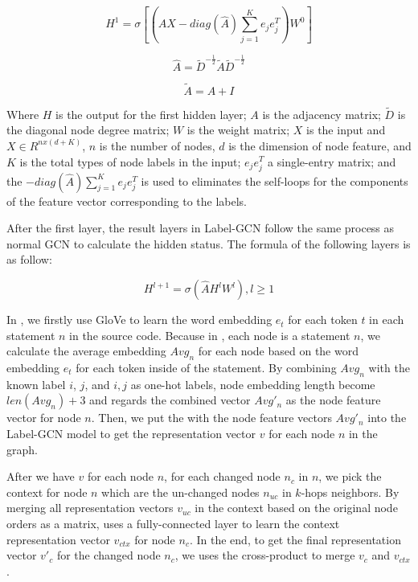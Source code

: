 \begin{equation}\label{eq1}
	H^1 = \sigma [(\hat{A}X-diag(\hat{A})\sum_{j=1}^{K}e_je^T_j)W^0]
\end{equation}

\begin{equation}\label{eq2}
	\hat{A} = \tilde{D}^{-\frac{1}{2}}\tilde{A}\tilde{D}^{-\frac{1}{2}}
\end{equation}

\begin{equation}\label{eq3}
	\tilde{A} = A + I
\end{equation}

Where $H$ is the output for the first hidden layer; $A$ is the adjacency matrix; $\tilde{D}$ is the diagonal node degree matrix; $W$ is the weight matrix; $X$ is the input and $X \in R^{nx(d+K)}$, $n$ is the number of nodes, $d$ is the dimension of node feature, and $K$ is the total types of node labels in the input; $e_je^T_j$ a single-entry matrix; and the $-diag(\hat{A})\sum_{j=1}^{K}e_je^T_j$ is used to eliminates the self-loops for the components of the feature vector corresponding to the labels.

After the first layer, the result layers in Label-GCN follow the same process as normal GCN to calculate the hidden status. The formula of the following layers is as follow:

\begin{equation}\label{eq4}
	H^{l+1} = \sigma (\hat{A}H^lW^l), l \geq 1 
\end{equation}

In \tool, we firstly use GloVe \cite{} to learn the word embedding $e_t$ for each token $t$ in each statement $n$ in the source code. Because in {\mvpdg}, each node is a statement $n$, we calculate the average embedding $Avg_n$ for each node based on the word embedding $e_t$ for each token inside of the statement. By combining $Avg_n$ with the known label $i$, $j$, and $i, j$ as one-hot labels, node embedding length become $len(Avg_n) + 3$ and \tool regards the combined vector $Avg'_n$ as the node feature vector for node $n$. Then, we put the {\mvpdg} with the node feature vectors $Avg'_n$ into the Label-GCN model to get the representation vector $v$ for each node $n$ in the graph.

After we have $v$ for each node $n$, for each changed node $n_c$ in $n$, we pick the context for node $n$ which are the un-changed nodes $n_{uc}$ in $k$-hops neighbors. By merging all representation vectors $v_{uc}$ in the context based on the original node orders as a matrix, \tool uses a fully-connected layer to learn the context representation vector $v_{ctx}$ for node $n_c$. In the end, to get the final representation vector $v'_c$ for the changed node $n_c$, we uses the cross-product to merge $v_c$ and $v_{ctx}$.

